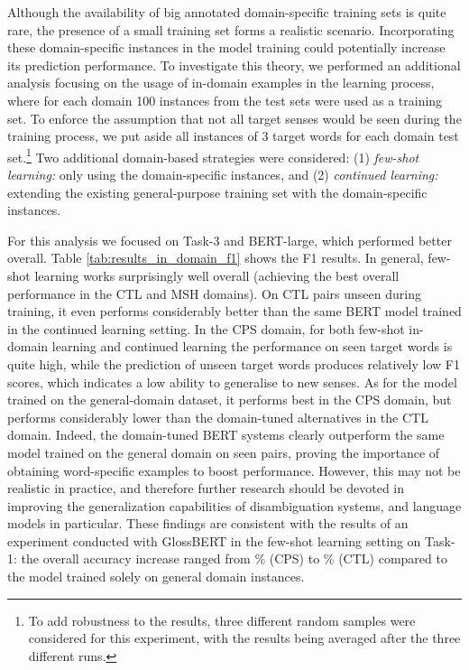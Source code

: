 \documentclass[11pt,a4paper]{article}
\begin{document}
Although the availability of big annotated domain-specific training sets is quite rare, the presence of a small training set forms a realistic scenario.
Incorporating these domain-specific instances in the model training could potentially increase its prediction performance. To investigate this theory, we performed an additional analysis focusing on the usage of in-domain examples in the learning process, where for each domain 100 instances from the test sets were used as a training set. To enforce the assumption that not all target senses would be seen during the training process, we put aside all instances of 3 target words for each domain test set.\footnote{To add robustness to the results, three different random samples were considered for this experiment, with the results being averaged after the three different runs.}
Two additional domain-based strategies were considered: (1) \textit{few-shot learning:} only using the domain-specific instances, and (2) \textit{continued learning:} extending the existing general-purpose training set with the domain-specific instances. 

For this analysis we focused on Task-3 and BERT-large, which performed better overall. Table \ref{tab:results_in_domain_f1} shows the F1 results. In general, 
few-shot learning
works surprisingly well overall (achieving the best overall performance in the CTL and MSH domains). On CTL pairs unseen during training, it even performs considerably better  than the same BERT model trained in the continued learning setting.
In the CPS domain, for both few-shot in-domain learning and continued learning the performance on seen target words is quite high, while the prediction of unseen target words produces relatively low F1 scores, which indicates a low ability to generalise to new senses.
As for the model trained on the general-domain dataset, it performs best in the CPS domain, but performs considerably lower than the domain-tuned alternatives in the CTL domain. Indeed, the domain-tuned BERT systems clearly outperform the same model trained on the general domain on seen pairs, proving the importance of obtaining word-specific examples to boost performance. 
However, this may not be realistic in practice, and therefore further research should be devoted in improving the generalization capabilities of disambiguation systems, and language models in particular.
These findings are consistent with the results of an experiment conducted with GlossBERT in the few-shot learning setting on Task-1: the overall accuracy increase ranged from \% (CPS) to \% (CTL) compared to the model trained solely on general domain instances.
\end{document}
